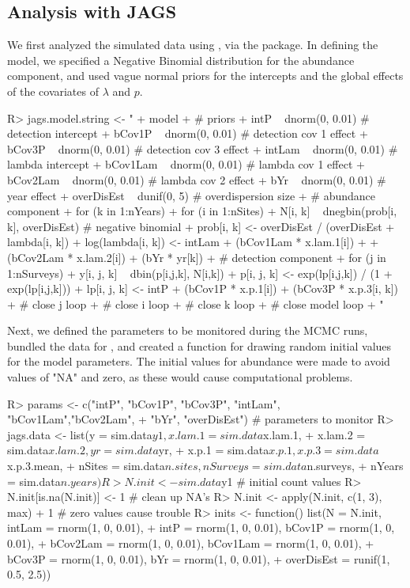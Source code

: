 \documentclass[article]{jss}
\begin{document}
\subsection[Analysis with JAGS]{Analysis with JAGS}
We first analyzed the simulated data using , via the  package. In defining the model, we specified a Negative Binomial distribution for the abundance component, and used vague normal priors for the intercepts and the global effects of the covariates of $\lambda$ and $p$.

\begin{CodeInput}
R> jags.model.string <- "
+    model {
+    # priors
+    intP ~ dnorm(0, 0.01)       # detection intercept
+    bCov1P ~ dnorm(0, 0.01)     # detection cov 1 effect
+    bCov3P ~ dnorm(0, 0.01)     # detection cov 3 effect
+    intLam ~ dnorm(0, 0.01)     # lambda intercept
+    bCov1Lam ~ dnorm(0, 0.01)   # lambda cov 1 effect
+    bCov2Lam ~ dnorm(0, 0.01)   # lambda cov 2 effect
+    bYr ~ dnorm(0, 0.01)        # year effect
+    overDisEst ~ dunif(0, 5)    # overdispersion size
+    # abundance component
+    for (k in 1:nYears){
+      for (i in 1:nSites){
+        N[i, k] ~ dnegbin(prob[i, k], overDisEst) # negative binomial
+        prob[i, k] <- overDisEst / (overDisEst + lambda[i, k])
+        log(lambda[i, k]) <- intLam + (bCov1Lam * x.lam.1[i]) + 
+                             (bCov2Lam * x.lam.2[i]) + (bYr * yr[k])
+    # detection component
+        for (j in 1:nSurveys){
+          y[i, j, k] ~ dbin(p[i,j,k], N[i,k])
+          p[i, j, k] <- exp(lp[i,j,k]) / (1 + exp(lp[i,j,k]))
+          lp[i, j, k] <- intP + (bCov1P * x.p.1[i]) + (bCov3P * x.p.3[i, k])
+        } # close j loop
+      } # close i loop
+    } # close k loop
+  } # close model loop
+  "
\end{CodeInput}

Next, we defined the parameters to be monitored during the MCMC runs, bundled the data for , and created a function for drawing random initial values for the model parameters. The initial values for abundance were made to avoid values of "NA" and zero, as these would cause computational problems.

\begin{CodeInput}
R> params <- c("intP", "bCov1P", "bCov3P", "intLam", "bCov1Lam","bCov2Lam",
+              "bYr", "overDisEst") # parameters to monitor
R> jags.data <- list(y = sim.data$y1, x.lam.1 = sim.data$x.lam.1,
+               x.lam.2 = sim.data$x.lam.2, yr = sim.data$yr,
+               x.p.1 = sim.data$x.p.1, x.p.3 = sim.data$x.p.3.mean,
+               nSites = sim.data$n.sites, nSurveys = sim.data$n.surveys,
+               nYears = sim.data$n.years)
R> N.init <- sim.data$y1 # initial count values
R> N.init[is.na(N.init)] <- 1 # clean up NA's
R> N.init <- apply(N.init, c(1, 3), max) + 1 # zero values cause trouble
R> inits <- function() list(N = N.init, intLam = rnorm(1, 0, 0.01),
+               intP = rnorm(1, 0, 0.01), bCov1P = rnorm(1, 0, 0.01),
+               bCov2Lam = rnorm(1, 0, 0.01), bCov1Lam = rnorm(1, 0, 0.01),
+               bCov3P = rnorm(1, 0, 0.01), bYr = rnorm(1, 0, 0.01),
+               overDisEst = runif(1, 0.5, 2.5))
\end{CodeInput}
\end{document}
